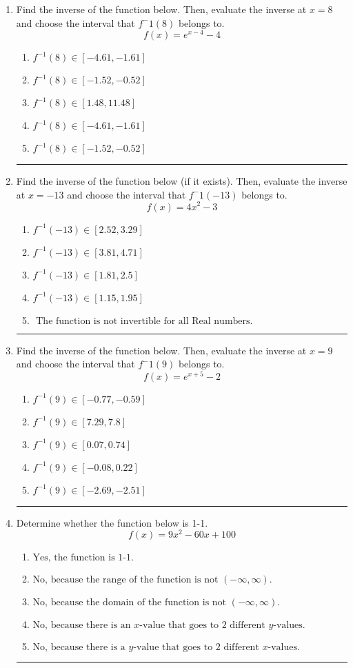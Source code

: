 \documentclass[14pt]{extbook}
\newcommand{\litem}[1]{\item#1\hspace*{-1cm}\rule{\textwidth}{0.4pt}}
\begin{document}
\begin{enumerate}
{\begin{enumerate}[label=\Alph*.]
\end{enumerate} }
\litem{
Find the inverse of the function below. Then, evaluate the inverse at $x = 8$ and choose the interval that $f^-1(8)$ belongs to.\[ f(x) = e^{x-4}-4 \]\begin{enumerate}[label=\Alph*.]
\item \( f^{-1}(8) \in [-4.61, -1.61] \)
\item \( f^{-1}(8) \in [-1.52, -0.52] \)
\item \( f^{-1}(8) \in [1.48, 11.48] \)
\item \( f^{-1}(8) \in [-4.61, -1.61] \)
\item \( f^{-1}(8) \in [-1.52, -0.52] \)

\end{enumerate} }
\litem{
Find the inverse of the function below (if it exists). Then, evaluate the inverse at $x = -13$ and choose the interval that $f^-1(-13)$ belongs to.\[ f(x) = 4 x^2 - 3 \]\begin{enumerate}[label=\Alph*.]
\item \( f^{-1}(-13) \in [2.52, 3.29] \)
\item \( f^{-1}(-13) \in [3.81, 4.71] \)
\item \( f^{-1}(-13) \in [1.81, 2.5] \)
\item \( f^{-1}(-13) \in [1.15, 1.95] \)
\item \( \text{ The function is not invertible for all Real numbers. } \)

\end{enumerate} }
\litem{
Find the inverse of the function below. Then, evaluate the inverse at $x = 9$ and choose the interval that $f^-1(9)$ belongs to.\[ f(x) = e^{x+5}-2 \]\begin{enumerate}[label=\Alph*.]
\item \( f^{-1}(9) \in [-0.77, -0.59] \)
\item \( f^{-1}(9) \in [7.29, 7.8] \)
\item \( f^{-1}(9) \in [0.07, 0.74] \)
\item \( f^{-1}(9) \in [-0.08, 0.22] \)
\item \( f^{-1}(9) \in [-2.69, -2.51] \)

\end{enumerate} }
\litem{
Determine whether the function below is 1-1.\[ f(x) = 9 x^2 - 60 x + 100 \]\begin{enumerate}[label=\Alph*.]
\item \( \text{Yes, the function is 1-1.} \)
\item \( \text{No, because the range of the function is not $(-\infty, \infty)$.} \)
\item \( \text{No, because the domain of the function is not $(-\infty, \infty)$.} \)
\item \( \text{No, because there is an $x$-value that goes to 2 different $y$-values.} \)
\item \( \text{No, because there is a $y$-value that goes to 2 different $x$-values.} \)


\end{enumerate}}
\end{enumerate}
\end{document}
